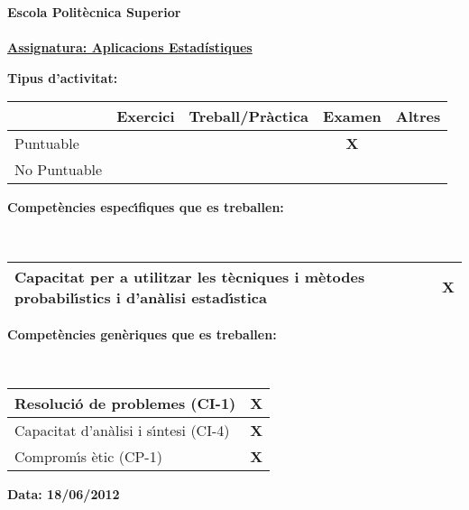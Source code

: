 \documentclass[a4paper,10pt]{article}
\begin{document}
\noindent\textbf{\large{Escola Polit\`ecnica Superior}}\\
\\

\noindent\textbf{\underline{\large{Assignatura: Aplicacions Estad\'{i}stiques}\hspace{10cm}} }\\ 
\noindent\begin{small}\textbf{Tipus d'activitat:}\end{small}
\begin{center}
\begin{tabular}{|l|c|c|c|c|}\hline
 		&Exercici & Treball/Pr\`actica & Examen & Altres \\ \hline
Puntuable       & 	  & 			 & \textbf{X}  	  & \\ \hline
No Puntuable    &  	  &			 & 	  & \\ \hline
\end{tabular}
\end{center}
\noindent\begin{small}\textbf{Compet\`encies espec\'{\i}fiques que es treballen:}\end{small}\\
\begin{tabular}{|l|c|}\hline
Capacitat per a utilitzar les t\`ecniques i m\`etodes probabil\'{\i}stics i d'an\`alisi estad\'{\i}stica & \textbf{X} \\ \hline
\end{tabular}\vspace{0.25cm}

\noindent\begin{small}\textbf{Compet\`encies gen\`eriques que es treballen:}\end{small}\\
\begin{tabular}{|l|c|}\hline
Resoluci\'o de problemes (CI-1) & \textbf{X}\\ \hline
Capacitat d'an\`alisi i s\'{\i}ntesi (CI-4) & \textbf{X}  \\ \hline
Comprom\'{\i}s \`etic (CP-1)$\quad$ & \textbf{X} \\ \hline
\end{tabular}\vspace{0.25cm}

\noindent\begin{small}\textbf{Data: 18/06/2012 }\end{small}\\
\noindent\underline{\hspace{18cm}}
\end{document}

